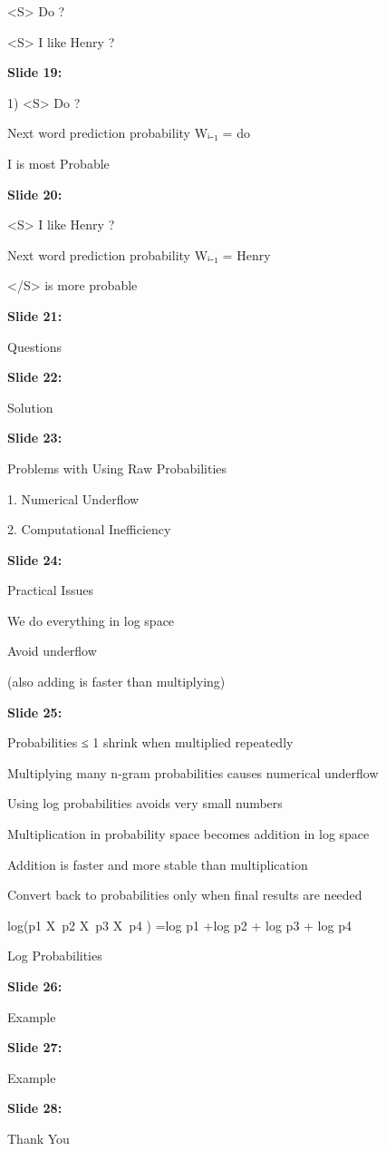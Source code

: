 \documentclass[11pt,a4paper]{article}
\begin{document}
<S> Do ?

<S> I like Henry ?

\textbf{Slide 19:}

1) <S> Do ?

Next word prediction probability Wᵢ₋₁ = do

I is most Probable

\textbf{Slide 20:}

<S> I like Henry ?

Next word prediction probability Wᵢ₋₁ = Henry

</S> is more probable

\textbf{Slide 21:}

Questions

\textbf{Slide 22:}

Solution

\textbf{Slide 23:}

Problems with Using Raw Probabilities

1. Numerical Underflow

2. Computational Inefficiency

\textbf{Slide 24:}

Practical Issues

We do everything in log space

Avoid underflow

(also adding is faster than multiplying)

\textbf{Slide 25:}

Probabilities ≤ 1 shrink when multiplied repeatedly

Multiplying many n-gram probabilities causes numerical underflow

Using log probabilities avoids very small numbers

Multiplication in probability space becomes addition in log space

Addition is faster and more stable than multiplication

Convert back to probabilities only when final results are needed

log(p1 X p2 X p3 X p4 ) =log p1 +log p2 + log p3 + log p4

Log Probabilities

\textbf{Slide 26:}

Example

\textbf{Slide 27:}

Example

\textbf{Slide 28:}

Thank You
\end{document}
